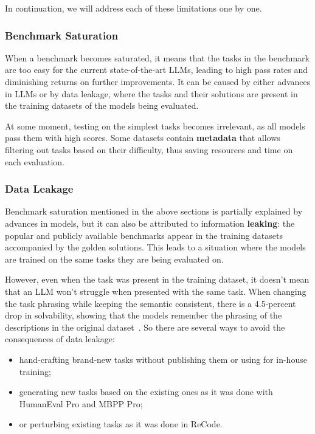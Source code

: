 In continuation, we will address each of these limitations one by one.

\subsubsection{Benchmark Saturation}

When a benchmark becomes saturated, it means that the tasks in the benchmark are too easy for the current state-of-the-art LLMs, leading to high pass rates and diminishing returns on further improvements.
It can be caused by either advances in LLMs or by data leakage, where the tasks and their solutions are present in the training datasets of the models being evaluated.

At some moment, testing on the simplest tasks becomes irrelevant, as all models pass them with high scores.
Some datasets contain \textbf{metadata} that allows filtering out tasks based on their difficulty, thus saving resources and time on each evaluation.

\subsubsection{Data Leakage}

Benchmark saturation mentioned in the above sections is partially explained by advances in models, but it can also be attributed to information \textbf{leaking}: the popular and publicly available benchmarks appear in the training datasets accompanied by the golden solutions.
This leads to a situation where the models are trained on the same tasks they are being evaluated on.

However, even when the task was present in the training dataset, it doesn't mean that an LLM won't struggle when presented with the same task.
When changing the task phrasing while keeping the semantic consistent, there is a 4.5-percent drop in solvability, showing that the models remember the phrasing of the descriptions in the original dataset~\cite{uniyal2024one}.
So there are several ways to avoid the consequences of data leakage:
\begin{itemize}
    \item hand-crafting brand-new tasks without publishing them or using for in-house training;
    \item generating new tasks based on the existing ones as it was done with HumanEval Pro and MBPP Pro;
    \item or perturbing existing tasks as it was done in ReCode.
\end{itemize}

